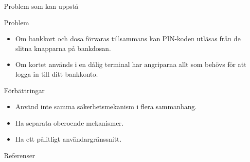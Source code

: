 \documentclass{beamer}
\theoremstyle{definition}
\theoremstyle{remark}
\begin{document}
\begin{frame}{Problem som kan uppstå}
  \begin{block}{Problem}
    \begin{itemize}
      \item Om bankkort och dosa förvaras tillsammans kan PIN-koden utläsas 
        från de slitna knapparna på bankdosan.
      \item Om kortet används i en dålig terminal har angriparna allt som 
        behövs för att logga in till ditt bankkonto.
    \end{itemize}
  \end{block}
  \begin{block}{Förbättringar}
    \begin{itemize}
      \item Använd inte samma säkerhetsmekanism i flera sammanhang.
      \item Ha separata oberoende mekanismer.
      \item Ha ett pålitligt användargränssnitt.
    \end{itemize}
  \end{block}
\end{frame}




\begin{frame}{Referenser}
	\small
  \printbibliography{}
\end{frame}
\end{document}
